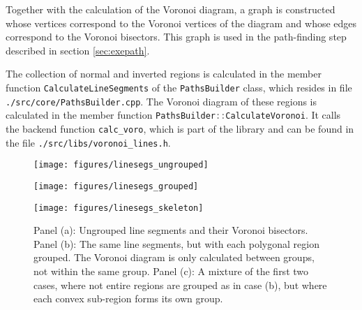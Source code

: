 Together with the calculation of the Voronoi diagram, a graph is constructed whose
vertices correspond to the Voronoi vertices of the diagram and whose edges correspond
to the Voronoi bisectors. This graph is used in the path-finding step described in 
section \ref{sec:exepath}.

The collection of normal and inverted regions is calculated in the member function
\lstinline[language=C++]|CalculateLineSegments| of the \lstinline[language=C++]|PathsBuilder|
class, which resides in file \lstinline|./src/core/PathsBuilder.cpp|. 
The Voronoi diagram of these regions is calculated in the member function
\lstinline[language=C++]|PathsBuilder::CalculateVoronoi|.
It calls the backend function \lstinline[language=C++]|calc_voro|, which is part
of the library and can be found in the file \lstinline|./src/libs/voronoi_lines.h|.


\label{sec:voronoi}
\begin{figure*}
	\begin{minipage}{0.5 \textwidth}
		\begin{center}
			\texttt{[image: figures/linesegs\_ungrouped]}
		\end{center}
	\end{minipage}
	\begin{minipage}{0.5 \textwidth}
		\begin{center}
			\texttt{[image: figures/linesegs\_grouped]}
		\end{center}
	\end{minipage}
	\vspace{0.25cm}

	\begin{minipage}{0.5 \textwidth}
		\begin{center}
			\texttt{[image: figures/linesegs\_skeleton]}
		\end{center}
	\end{minipage}
	\caption{Panel (a): Ungrouped line segments and their Voronoi bisectors.
		Panel (b): The same line segments, but with each polygonal region grouped.
		The Voronoi diagram is only calculated between groups, not within the same group.
		Panel (c): A mixture of the first two cases, where not entire regions are grouped
		as in case (b), but where each convex sub-region forms its own group.
		\label{fig:linesegs_grouped_voro}}
\end{figure*}






